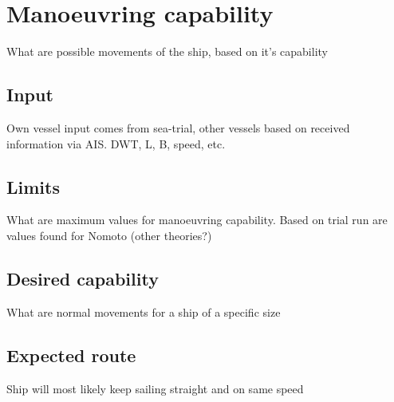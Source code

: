 \chapter{Manoeuvring capability}
What are possible movements of the ship, based on it's capability

\section{Input}
Own vessel input comes from sea-trial, other vessels based on received information via AIS.
DWT, L, B, speed, etc.

\section{Limits}
What are maximum values for manoeuvring capability. Based on trial run are values found for Nomoto (other theories?)
	
\section{Desired capability}
What are normal movements for a ship of a specific size

\section{Expected route}
Ship will most likely keep sailing straight and on same speed